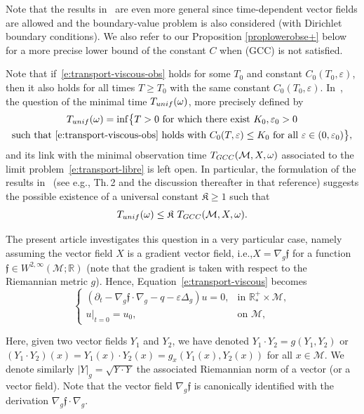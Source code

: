 \documentclass[11pt]{article}
\newcommand{\ie}{i.e.,\xspace}
\newcommand{\eg}{e.g.,\xspace}
\numberwithin{equation}{section}
\newcommand{\GCC}{\textup{GCC}}
\newcommand{\pGCC}{\textup{(GCC)}\xspace}
\newcommand{\unif}{\textup{unif}}
\theoremstyle{definition}
\newcommand{\M}{\ensuremath{\mathcal M}}
\newcommand{\mb}[1]{\ensuremath{\mathbb{#1}}}
\newcommand{\R}{{\mb{R}}}
\newcommand{\f}{\ensuremath{\mathfrak{f}}}
\let\d\partial
\let\eps\varepsilon
\let\q q
\begin{document}
Note that the results in~\cite{GL:07} are even more general since time-dependent vector fields are allowed and the boundary-value problem is also considered (with Dirichlet boundary conditions). We also refer to our Proposition \ref{proplowerobse+} below for a more precise lower bound of the constant $C$ when \pGCC is not satisfied.

Note that if~\eqref{e:transport-viscous-obs} holds for some $T_0$ and constant $C_0(T_0,\eps)$, then it also holds for all times $T\geq T_0$ with the same constant $C_0(T_0,\eps)$.
In~\cite{GL:07}, the question of the minimal time $T_{\unif}(\omega)$, more precisely defined by
\begin{multline*}
T_{\unif}(\omega) = \inf \bigl\{ T >0 \text{ for which there exist }K_0, \eps_0>0 \\
\text {such that~\eqref{e:transport-viscous-obs} holds with }C_0(T,\eps)\leq K_0 \text{ for all } \eps \in (0,\eps_0) \bigr\},
\end{multline*}
and its link with the minimal observation time $T_{\GCC}(\M,X,\omega)$ associated to the limit problem~\eqref{e:transport-libre} is left open.
In particular, the formulation of the results in~\cite{GL:07} (see \eg Th.\,2 and the discussion thereafter in that reference) suggests the possible existence of a universal constant $\mathfrak{K}\geq 1$ such that
\begin{equation}
\label{e:universal-K}
T_{\unif}(\omega) \leq \mathfrak{K}\ T_{\GCC}(\M,X,\omega).
\end{equation}

The present article investigates this question in a very particular case, namely assuming the vector field $X$ is a gradient vector field, \ie $X= \nabla_g \f$ for a function $\f\in W^{2,\infty}(\M;\R)$ (note that the gradient is taken with respect to the Riemannian metric $g$). Hence, Equation~\eqref{e:transport-viscous} becomes
\begin{equation}
\label{e:transport-viscous-gradient}
\begin{cases}
(\d_t - \nabla_g \f \cdot \nabla_g -\q - \eps \Delta_g ) u = 0, & \text{in } \R^+_*\times \M, \\
u|_{t=0} = u_0, & \text{on } \M,
\end{cases}
\end{equation}

Here, given two vector fields $Y_1$ and $Y_2$, we have denoted $Y_1\cdot Y_2 = g(Y_1,Y_2)$ or $(Y_1\cdot Y_2)(x) = Y_1(x)\cdot Y_2(x) = g_x(Y_1(x),Y_2(x))$ for all $x\in \M$. We denote similarly $|Y|_g = \sqrt{Y \cdot Y}$ the associated Riemannian norm of a vector (or a vector field).
Note that the vector field $\nabla_g \f$ is canonically identified with the derivation $\nabla_g \f \cdot \nabla_g$.
\end{document}
